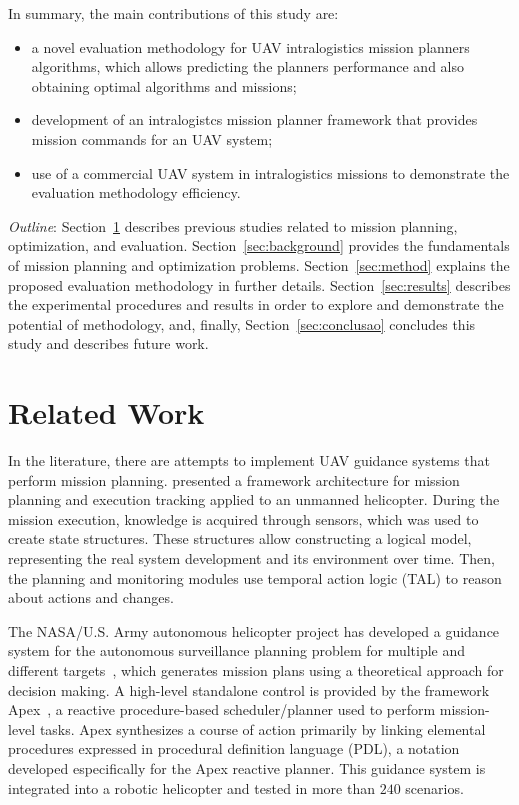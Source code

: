 \documentclass[conference,harvard,brazil,english]{sbatex}
\begin{document}
In summary, the main contributions of this study are:
\begin{itemize}
\item a novel evaluation methodology for UAV intralogistics mission planners algorithms, which allows predicting the planners performance and also obtaining optimal algorithms and missions;
\item development of an intralogistcs mission planner framework that provides mission commands for an UAV system; 
\item use of a commercial UAV system in intralogistics missions to demonstrate the evaluation methodology efficiency.
\end{itemize}

\textit{Outline}: Section~\ref{sec:related} describes previous studies related to mission planning, optimization, and evaluation. Section~\ref{sec:background} provides the fundamentals of mission planning and optimization problems. Section~\ref{sec:method} explains the proposed evaluation methodology in further details. Section~\ref{sec:results} describes the experimental procedures and results in order to explore and demonstrate the potential of methodology, and, finally, Section~\ref{sec:conclusao} concludes this study and describes future work.

\section{Related Work}
\label{sec:related}

In the literature, there are attempts to implement UAV guidance systems that perform mission planning.  presented a framework architecture for mission planning and execution tracking applied to an unmanned helicopter. During the mission execution, knowledge is acquired through sensors, which was used to create state structures. These structures allow constructing a logical model, representing the real system development and its environment over time. Then, the planning and monitoring modules use temporal action logic (TAL) to reason about actions and changes.

The NASA/U.S. Army autonomous helicopter project has developed a guidance system for the autonomous surveillance planning problem for multiple and different targets~\cite{whalley2005design}, which generates mission plans using a theoretical approach for decision making. A high-level standalone control is provided by the framework Apex~\cite{baer1998nasa}, a reactive procedure-based scheduler/planner used to perform mission-level tasks. Apex synthesizes a course of action primarily by linking elemental procedures expressed in procedural definition language (PDL), a notation developed especifically for the Apex reactive planner. This guidance system is integrated into a robotic helicopter and tested in more than $240$ scenarios.
\end{document}
